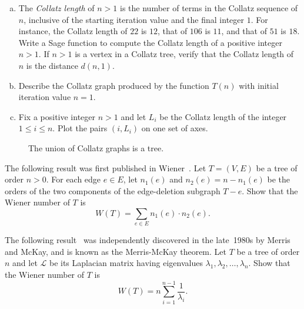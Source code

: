 \begin{problem}
\begin{enumerate}[(a)]
  \item The \emph{Collatz length} of $n > 1$ is the number of terms in
    the Collatz sequence of $n$, inclusive of the starting iteration
    value and the final integer $1$. For instance, the Collatz length
    of $22$ is $12$, that of $106$ is $11$, and that of $51$ is
    $18$. Write a Sage function to compute the Collatz length of a
    positive integer $n > 1$. If $n > 1$ is a vertex in a Collatz
    tree, verify that the Collatz length of $n$ is the distance
    $d(n,1)$.

  \item Describe the Collatz graph produced by the function $T(n)$
    with initial iteration value $n = 1$.

  \item Fix a positive integer $n > 1$ and let $L_i$ be the Collatz
    length of the integer $1 \leq i \leq n$. Plot the pairs $(i, L_i)$
    on one set of axes.
  \end{enumerate}

\begin{figure}[!htbp]
\centering

\caption{The union of Collatz graphs is a tree.}
\label{fig:trees_forests:Collatz_graph_union}
\end{figure}

\item The following result was first published in
  Wiener~\cite{Wiener1947}. Let $T = (V,E)$ be a tree of order $n > 0$.
  For each edge $e \in E$, let $n_1(e)$ and $n_2(e) = n - n_1(e)$ be
  the orders of the two components of the edge-deletion subgraph
  $T - e$. Show that the Wiener number of $T$ is
  \[
  W(T)
  =
  \sum_{e \in E} n_1(e) \cdot n_2(e).
  \]

\item The following result~\cite{MoharEtAl1993} was independently
  discovered in the late~1980s by Merris and McKay, and is known as
  the Merris-McKay theorem. Let $T$ be a tree of order $n$ and let
  $\mathcal{L}$ be its Laplacian matrix having eigenvalues
  $\lambda_1, \lambda_2, \dots, \lambda_n$. Show that the Wiener
  number of $T$ is
  \[
  W(T)
  =
  n \sum_{i=1}^{n-1} \frac{1}{\lambda_i}.
  \]
\end{problem}
